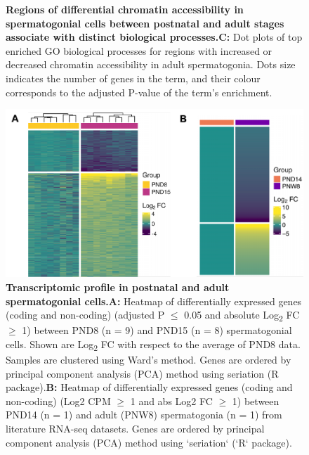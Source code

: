 \documentclass[12pt,twoside]{reedthesis}
\begin{document}
\begin{subfigures}
\begin{figure}[htbp]
{}

\caption[Regions of differential chromatin accessibility in spermatogonial cells between postnatal and adult stages]{\textbf{Regions of differential chromatin accessibility in spermatogonial cells between postnatal and adult stages associate with distinct biological processes.}\newline \textbf{C:} Dot plots of top enriched GO biological processes for regions with increased or decreased chromatin accessibility in adult spermatogonia. Dots size indicates the number of genes in the term, and their colour corresponds to the adjusted P-value of the term’s enrichment.}\label{fig:df1b}
\end{figure}
\end{subfigures}
\begin{subfigures}


\begin{figure}[htbp]

{\centering \includegraphics{thesis_files/figure-latex/df2a-1} 

}

\caption[Transcriptomic profile in postnatal and adult spermatogonial cells]{\textbf{Transcriptomic profile in postnatal and adult spermatogonial cells.}\newline \textbf{A:} Heatmap of differentially expressed genes (coding and non-coding) (adjusted P $\leq$ 0.05 and absolute Log\textsubscript{2} FC $\geq$ 1) between PND8 (n = 9) and PND15 (n = 8) spermatogonial cells. Shown are Log\textsubscript{2} FC with respect to the average of PND8 data. Samples are clustered using Ward’s method. Genes are ordered by principal component analysis (PCA) method using seriation (R package).\newline \textbf{B:} Heatmap of differentially expressed genes (coding and non-coding) (Log2 CPM $\geq$ 1 and abs Log2 FC $\geq$ 1) between PND14 (n = 1) and adult (PNW8) spermatogonia (n = 1) from literature RNA-seq datasets. Genes are ordered by principal component analysis (PCA) method using `seriation` (`R` package).}\label{fig:df2a}
\end{figure}


\end{subfigures}
\end{document}
